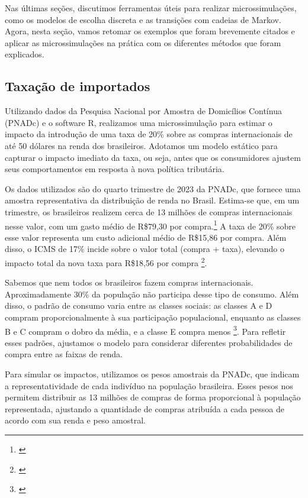 \documentclass[12pt]{article}
\theoremstyle{break}
\begin{document}
Nas últimas seções, discutimos ferramentas úteis para realizar microssimulações, como os modelos de escolha discreta e as transições com cadeias de Markov. Agora, nesta seção, vamos retomar os exemplos que foram brevemente citados e aplicar as microssimulações na prática com os diferentes métodos que foram explicados.

\subsection{Taxação de importados}
\label{sec: exemplo_1}

Utilizando dados da Pesquisa Nacional por Amostra de Domicílios Contínua (PNADc) e o software R, realizamos uma microssimulação para estimar o impacto da introdução de uma taxa de 20\% sobre as compras internacionais de até 50 dólares na renda dos brasileiros. Adotamos um modelo estático para capturar o impacto imediato da taxa, ou seja, antes que os consumidores ajustem seus comportamentos em resposta à nova política tributária.

Os dados utilizados são do quarto trimestre de 2023 da PNADc, que fornece uma amostra representativa da distribuição de renda no Brasil. Estima-se que, em um trimestre, os brasileiros realizem cerca de 13 milhões de compras internacionais nesse valor, com um gasto médio de R\$79,30 por compra.\footnote{\textcite{folha_remessas}} A taxa de 20\% sobre esse valor representa um custo adicional médio de R\$15,86 por compra. Além disso, o ICMS de 17\% incide sobre o valor total (compra + taxa), elevando o impacto total da nova taxa para R\$18,56 por compra \footnote{\textcite{g1_comprasinter}}.

Sabemos que nem todos os brasileiros fazem compras internacionais. Aproximadamente 30\% da população não participa desse tipo de consumo. Além disso, o padrão de consumo varia entre as classes sociais: as classes A e D compram proporcionalmente à sua participação populacional, enquanto as classes B e C compram o dobro da média, e a classe E compra menos \footnote{\textcite{insights_shein}}. Para refletir esses padrões, ajustamos o modelo para considerar diferentes probabilidades de compra entre as faixas de renda.

Para simular os impactos, utilizamos os pesos amostrais da PNADc, que indicam a representatividade de cada indivíduo na população brasileira. Esses pesos nos permitem distribuir as 13 milhões de compras de forma proporcional à população representada, ajustando a quantidade de compras atribuída a cada pessoa de acordo com sua renda e peso amostral.
\end{document}
